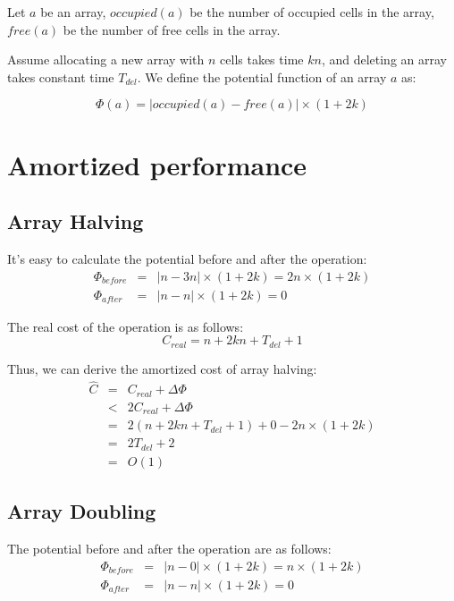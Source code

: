 Let $a$ be an array, $occupied(a)$ be the number of occupied cells in the array, $free(a)$ be the number of free cells in the array.

Assume allocating a new array with $n$ cells takes time $kn$, and deleting an array takes constant time $T_{del}$. We define the potential function of an array $a$ as:

\begin{equation}
\Phi(a) = | occupied(a) - free(a) | \times (1 + 2k)
\end{equation}

\section{Amortized performance}

  \subsection{Array Halving}
  It's easy to calculate the potential before and after the operation:
  \[
  \begin{array}{lcl}
    \Phi_{before} & = & | n - 3n | \times (1 + 2k) = 2n \times (1 + 2k) \\
    \Phi_{after} & = & | n - n | \times (1 + 2k) = 0
  \end{array}
  \]


  The real cost of the operation is as follows:
  \[
  C_{real} = n + 2kn + T_{del} + 1
  \]


  Thus, we can derive the amortized cost of array halving:
  \[
  \begin{array}{lcl}
  \hat C & = & C_{real} + \Delta \Phi \\
         & < & 2 C_{real} + \Delta \Phi \\
         & = & 2(n + 2kn + T_{del} + 1) + 0 - 2n \times (1 + 2k) \\
         & = & 2T_{del} + 2 \\
         & = & O(1)
  \end{array}
  \]

  \subsection{Array Doubling}
  The potential before and after the operation are as follows:
  \[
  \begin{array}{lcl}
    \Phi_{before} & = & | n - 0 | \times (1 + 2k) = n \times (1 + 2k) \\
    \Phi_{after} & = & | n - n | \times (1 + 2k) = 0
  \end{array}
  \]

